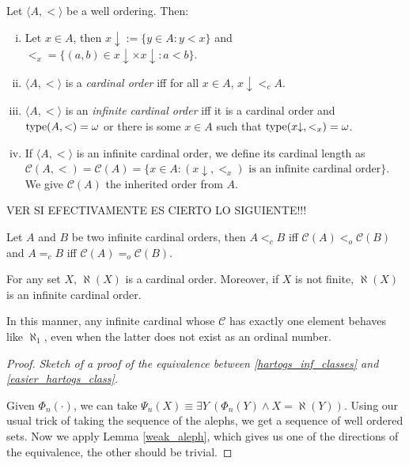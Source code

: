 \begin{definition}
	Let $\langle A,< \rangle$ be a well ordering. Then:
	\begin{enumerate}[(i)]
		\item Let $x\in A$, then $x{\downarrow} := \{y\in A: y<x\}$ and $<_x = \{(a,b) \in x{\downarrow}\times x{\downarrow} : a<b\}$.
		\item $\langle A,< \rangle$ is a \emph{cardinal order} iff for all $x\in A$, $x{\downarrow} <_c A$.
		\item $\langle A,< \rangle$ is an \emph{infinite cardinal order} iff it is a cardinal order and ${\operatorname{type}(A,<)} = \omega$ or there is some $x\in A$ such that $\operatorname{type}(x{\downarrow},<_x) = \omega$.
		\item If $\langle A,< \rangle$ is an infinite cardinal order, we define its cardinal length as $\mathcal{C}(A,<) = \mathcal{C}(A) = \{x\in A: (x{\downarrow},<_x) \text{ is an infinite cardinal order}\}$. We give $\mathcal{C}(A)$ the inherited order from $A$.
	\end{enumerate}
\end{definition}

VER SI EFECTIVAMENTE ES CIERTO LO SIGUIENTE!!!

\begin{lemma}
	\label{weak_aleph}
	Let $A$ and $B$ be two infinite cardinal orders, then $A <_c B$ iff $\mathcal{C}(A) <_o \mathcal{C}(B)$ and $A =_c B$ iff $\mathcal{C}(A) =_o \mathcal{C}(B)$.
\end{lemma}

\begin{lemma}
	For any set $X$, $\aleph(X)$ is a cardinal order. Moreover, if $X$ is not finite, $\aleph(X)$ is an infinite cardinal order.
\end{lemma}

In this manner, any infinite cardinal whose $\mathcal{C}$ has exactly one element behaves like $\aleph_1$, even when the latter does not exist as an ordinal number.

\begin{proof}
	\emph{Sketch of a proof of the equivalence between \ref{hartogs_inf_classes} and \ref{easier_hartogs_class}.}
	
	Given $\Phi_n (\cdot)$, we can take $\Psi_n (X) \equiv \exists Y \ (\Phi_n (Y) \land X = \aleph(Y))$. Using our usual trick of taking the sequence of the alephs, we get a sequence of well ordered sets. Now we apply Lemma \ref{weak_aleph}, which gives us one of the directions of the equivalence, the other should be trivial.
\end{proof}



\printindex
